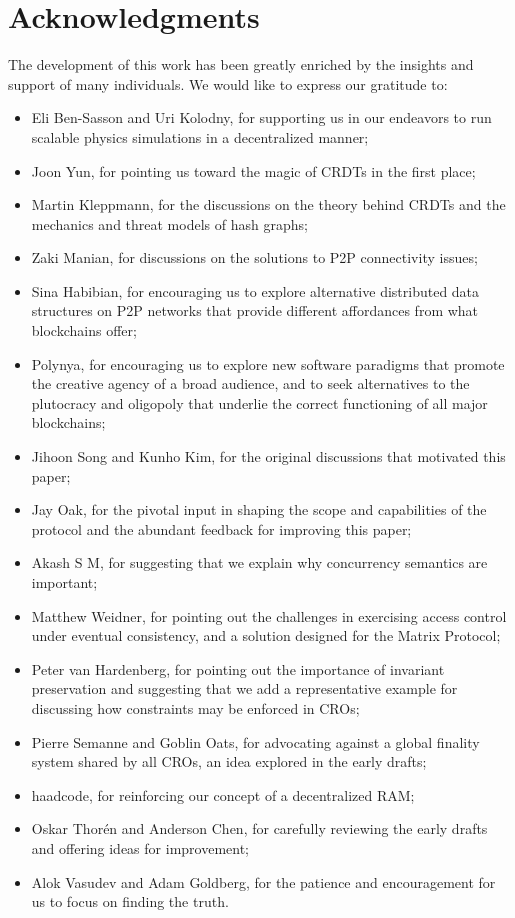 \documentclass{article}
\begin{document}
\section*{Acknowledgments}

The development of this work has been greatly enriched by the insights and support of many individuals. We would like to express our gratitude to:
\begin{itemize}[leftmargin=0.5cm]
\item Eli Ben-Sasson and Uri Kolodny, for supporting us in our endeavors to run scalable physics simulations in a decentralized manner;
\item Joon Yun, for pointing us toward the magic of CRDTs in the first place;
\item Martin Kleppmann, for the discussions on the theory behind CRDTs and the mechanics and threat models of hash graphs;
\item Zaki Manian, for discussions on the solutions to P2P connectivity issues;
\item Sina Habibian, for encouraging us to explore alternative distributed data structures on P2P networks that provide different affordances from what blockchains offer;
\item Polynya, for encouraging us to explore new software paradigms that promote the creative agency of a broad audience, and to seek alternatives to the plutocracy and oligopoly that underlie the correct functioning of all major blockchains;
\item Jihoon Song and Kunho Kim, for the original discussions that motivated this paper;
\item Jay Oak, for the pivotal input in shaping the scope and capabilities of the protocol and the abundant feedback for improving this paper;
\item Akash S M, for suggesting that we explain why concurrency semantics are important;
\item Matthew Weidner, for pointing out the challenges in exercising access control under eventual consistency, and a solution designed for the Matrix Protocol;
\item Peter van Hardenberg, for pointing out the importance of invariant preservation and suggesting that we add a representative example for discussing how constraints may be enforced in CROs;
\item Pierre Semanne and Goblin Oats, for advocating against a global finality system shared by all CROs, an idea explored in the early drafts;
\item haadcode, for reinforcing our concept of a decentralized RAM;
\item Oskar Thorén and Anderson Chen, for carefully reviewing the early drafts and offering ideas for improvement;
\item Alok Vasudev and Adam Goldberg, for the patience and encouragement for us to focus on finding the truth.
\end{itemize}
\end{document}
